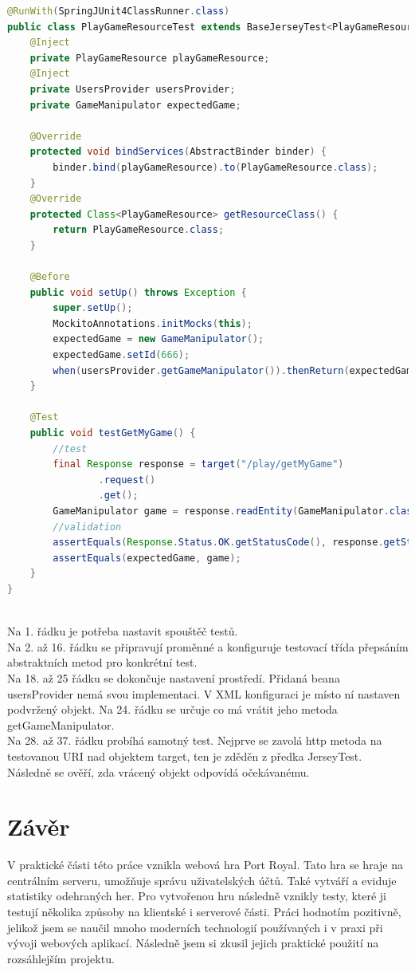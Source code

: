 \documentclass[czech,master,public,dept460,male,cpdeclaration,twoside]{diploma}
\begin{document}
\begin{lstlisting}[language=Java, caption=Konkrétní Jersey test]
@RunWith(SpringJUnit4ClassRunner.class)
public class PlayGameResourceTest extends BaseJerseyTest<PlayGameResource> {
    @Inject
    private PlayGameResource playGameResource;
    @Inject
    private UsersProvider usersProvider;
    private GameManipulator expectedGame;

    @Override
    protected void bindServices(AbstractBinder binder) {
        binder.bind(playGameResource).to(PlayGameResource.class);
    }
    @Override
    protected Class<PlayGameResource> getResourceClass() {
        return PlayGameResource.class;
    }
    
    @Before
    public void setUp() throws Exception {
        super.setUp();
        MockitoAnnotations.initMocks(this);
        expectedGame = new GameManipulator();
        expectedGame.setId(666);
        when(usersProvider.getGameManipulator()).thenReturn(expectedGame);
    }
    
    @Test
    public void testGetMyGame() {
        //test
        final Response response = target("/play/getMyGame")
                .request()
                .get();
        GameManipulator game = response.readEntity(GameManipulator.class);
        //validation
        assertEquals(Response.Status.OK.getStatusCode(), response.getStatus());
        assertEquals(expectedGame, game);
    }
}
\end{lstlisting}
~\\
Na 1. řádku je potřeba nastavit spouštěč testů.\\
Na 2. až 16. řádku se připravují proměnné a konfiguruje testovací třída přepsáním abstraktních metod pro konkrétní test.\\
Na 18. až 25 řádku se dokončuje nastavení prostředí. Přidaná beana usersProvider nemá svou implementaci. V XML konfiguraci je místo ní nastaven podvržený objekt. Na 24. řádku se určuje co má vrátit jeho metoda getGameManipulator.\\
Na 28. až 37. řádku probíhá samotný test. Nejprve se zavolá http metoda na testovanou URI nad objektem target, ten je zděděn z předka JerseyTest. Následně se ověří, zda vrácený objekt odpovídá očekávanému.

\section{Závěr}
V praktické části této práce vznikla webová hra Port Royal. Tato hra se hraje na centrálním serveru, umožňuje správu uživatelských účtů. Také vytváří a eviduje statistiky odehraných her. Pro vytvořenou hru následně vznikly testy, které ji testují několika způsoby na klientské i serverové části. Práci hodnotím pozitivně, jelikož jsem se naučil mnoho moderních technologií používaných i v praxi při vývoji webových aplikací. Následně jsem si zkusil jejich praktické použití na rozsáhlejším projektu.
\end{document}
